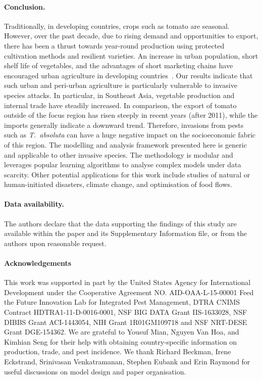 \documentclass[11pt]{article}
\newcommand{\tuta}{\emph{T.~absoluta}}
\theoremstyle{definition}
\begin{document}
\paragraph{Conclusion.} Traditionally, in developing countries, crops such
as tomato are seasonal. However, over the past decade, due to rising demand and
opportunities to export, there has been a thrust towards year-round
production using protected cultivation methods and resilient varieties.
An increase in urban population, short shelf life of vegetables, and the
advantages of short marketing chains have encouraged urban agriculture in
developing countries~\cite{moustier2015urban}. Our results indicate that
such urban and peri-urban agriculture is particularly vulnerable to
invasive species attacks. In particular, in Southeast Asia, vegetable
production and internal trade have steadily increased. In comparison, the
export of tomato outside of the focus region has risen steeply in 
recent years (after 2011), while the imports generally indicate a downward
trend.  Therefore, invasions from pests such as \tuta{} can have a huge
negative impact on the socioeconomic fabric of this region. The modelling
and analysis framework presented here is generic and applicable to other
invasive species.  The methodology is modular and leverages popular
learning algorithms to analyse complex models under data scarcity.  Other
potential applications for this work include studies of natural or
human-initiated disasters, climate change, and optimisation of food flows.
\paragraph{Data availability.} The authors declare that the data supporting the
findings of this study are available within the paper and its Supplementary
Information file, or from the authors upon reasonable request.

\paragraph{Acknowledgements}
This work was supported in part by the United States Agency for
International Development under the Cooperative Agreement NO.
AID-OAA-L-15-00001 Feed the Future Innovation Lab for Integrated Pest
Management, DTRA CNIMS Contract HDTRA1-11-D-0016-0001, NSF BIG DATA Grant
IIS-1633028, NSF DIBBS Grant ACI-1443054, NIH Grant 1R01GM109718 and NSF
NRT-DESE Grant DGE-154362.  We are grateful to Yousuf Mian, Nguyen Van Hoa,
and Kimhian Seng for their help with obtaining country-specific information
on production, trade, and pest incidence. We thank Richard Beckman, Irene
Eckstrand, Srinivasan Venkatramanan, Stephen Eubank and Erin Raymond for
useful discussions on model design and paper organisation.
\end{document}
